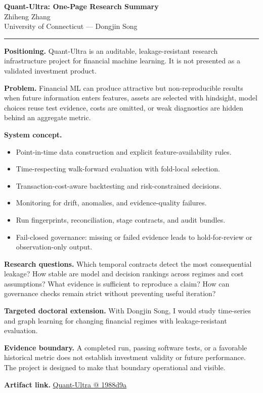 \documentclass[11pt]{article}
\makeatletter
\newcommand{\ApplicantName}{Zhiheng Zhang}
\newcommand{\ApplicantGitHub}{\href{https://github.com/zhiheng-zhang-Mera/Quant-Ultra/tree/1988d9a8530da91a8158de864d098ea869098923}{Quant-Ultra @ 1988d9a}}
\makeatother
\begin{document}
\begin{center}
{\LARGE\bfseries Quant-Ultra: One-Page Research Summary}\\[0.25em]
{\large \ApplicantName}\\
University of Connecticut --- Dongjin Song
\end{center}
\vspace{0.35em}\hrule\vspace{0.65em}

\textbf{Positioning.} Quant-Ultra is an auditable, leakage-resistant research infrastructure project for financial machine learning. It is not presented as a validated investment product.

\textbf{Problem.} Financial ML can produce attractive but non-reproducible results when future information enters features, assets are selected with hindsight, model choices reuse test evidence, costs are omitted, or weak diagnostics are hidden behind an aggregate metric.

\textbf{System concept.}
\begin{itemize}
\item Point-in-time data construction and explicit feature-availability rules.
\item Time-respecting walk-forward evaluation with fold-local selection.
\item Transaction-cost-aware backtesting and risk-constrained decisions.
\item Monitoring for drift, anomalies, and evidence-quality failures.
\item Run fingerprints, reconciliation, stage contracts, and audit bundles.
\item Fail-closed governance: missing or failed evidence leads to hold-for-review or observation-only output.
\end{itemize}

\textbf{Research questions.} Which temporal contracts detect the most consequential leakage? How stable are model and decision rankings across regimes and cost assumptions? What evidence is sufficient to reproduce a claim? How can governance checks remain strict without preventing useful iteration?

\textbf{Targeted doctoral extension.} With Dongjin Song, I would study time-series and graph learning for changing financial regimes with leakage-resistant evaluation.

\textbf{Evidence boundary.} A completed run, passing software tests, or a favorable historical metric does not establish investment validity or future performance. The project is designed to make that boundary operational and visible.

\textbf{Artifact link.} \ApplicantGitHub
\end{document}
